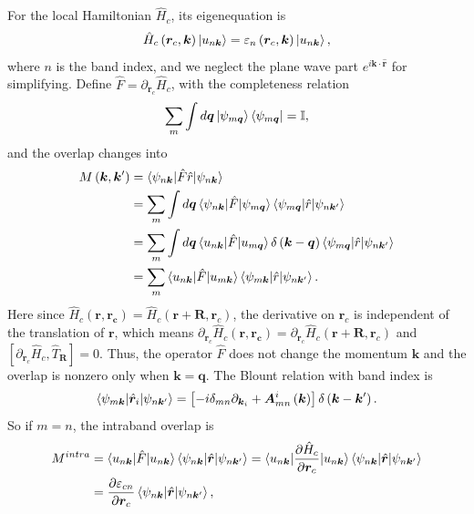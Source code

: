 \documentclass[12pt, oneside]{article}
\newcommand{\pr}{\prime}
\newcommand{\pa}{\partial}
\newcommand{\p}[1]{\left(#1\right)}
\newcommand{\bb}[1]{\left[#1\right]}
\numberwithin{equation}{subsection}
\begin{document}
For the local Hamiltonian \(\hat{H}_{c}\), its eigenequation is 
\begin{align}
	\hat{H}_{c} \p{\bm{r}_c, \bm{k}} \ket{u_{n \bm{k}}} = \varepsilon_{n} \p{\bm{r}_c, \bm{k}} \ket{u_{n \bm{k}}},
\end{align}
where \(n\) is the band index, and we neglect the plane wave part \(e^{i \bm{k} \cdot \hat{\bm{r}}}\) for simplifying. Define \(\hat{F} = \pa_{\bm{r}_c} \hat{H}_c\), with the completeness relation 
\begin{align}
	\sum_{m} \int d \bm{q} \ket{\psi_{m  \bm{q}}} \bra{\psi_{m \bm{q}}} = \mathbb{I},
\end{align}
and the overlap changes into 
\begin{align}
	\begin{split}
		M \p{\bm{k}, \bm{k}^\pr} & = \braket{\psi_{n \bm{k}} | \hat{F} \hat{r} | \psi_{n \bm{k}}} \\
		& = \sum_{m} \int d \bm{q} \braket{\psi_{n \bm{k}} | \hat{F} | \psi_{m \bm{q}}} \braket{\psi_{m \bm{q}} | \hat{r} | \psi_{n \bm{k}^\pr}} \\
		& = \sum_{m} \int d \bm{q} \braket{u_{n \bm{k}} | \hat{F} | u_{m \bm{q}}} \delta \p{\bm{k} - \bm{q}}  \braket{\psi_{m \bm{q}} | \hat{r} | \psi_{n \bm{k}^\pr}} \\
		& =  \sum_{m}  \braket{u_{n \bm{k}} | \hat{F} | u_{m \bm{k}}}  \braket{\psi_{m \bm{k}} | \hat{r} | \psi_{n \bm{k}^\pr}}.
	\end{split}
\end{align}
Here since \(\hat{H}_{c} \p{\bm{r, \bm{r}_{c}}} = \hat{H}_{c} \p{\bm{r} + \bm{R}, \bm{r}_c}\), the derivative on \(\bm{r}_c\) is independent of the translation of \(\bm{r}\), which means \(\pa_{\bm{r}_c} \hat{H}_{c} \p{\bm{r, \bm{r}_{c}}} = \pa_{\bm{r}_c} \hat{H}_{c} \p{\bm{r} + \bm{R}, \bm{r}_c}\) and \(\bb{\pa_{\bm{r}_c}  \hat{H}_{c}, \hat{T}_{\bm{R}}} = 0\). Thus, the operator \(\hat{F}\) does not change the momentum \(\bm{k}\) and the overlap is nonzero only when \(\bm{k} = \bm{q}\). The Blount relation with band index is 
\begin{align}
	\braket{\psi_{m \bm{k}} | \hat{\bm{r}}_i | \psi_{n \bm{k}^\pr}} = \bb{-i \delta_{mn} \pa_{\bm{k}_i} + \bm{A}^{i}_{mn} \p{\bm{k}}} \delta \p{\bm{k} - \bm{k}^\pr}.
\end{align}
So if \(m = n\), the intraband overlap is 
\begin{align}
	\begin{split}
		M^{intra} & =  \braket{u_{n \bm{k}} | \hat{F} | u_{n \bm{k}}}  \braket{\psi_{n \bm{k}} | \hat{\bm{r}} | \psi_{n \bm{k}^\pr}} = \braket{u_{n \bm{k}} | \frac{\pa \hat{H}_c}{\pa \bm{r}_c} | u_{n \bm{k}}}  \braket{\psi_{n \bm{k}} | \hat{\bm{r}} | \psi_{n \bm{k}^\pr}} \\
		& = \frac{\pa \varepsilon_{cn}}{\pa \bm{r}_c}   \braket{\psi_{n \bm{k}} | \hat{\bm{r}} | \psi_{n \bm{k}^\pr}},
	\end{split}
\end{align}
\end{document}

